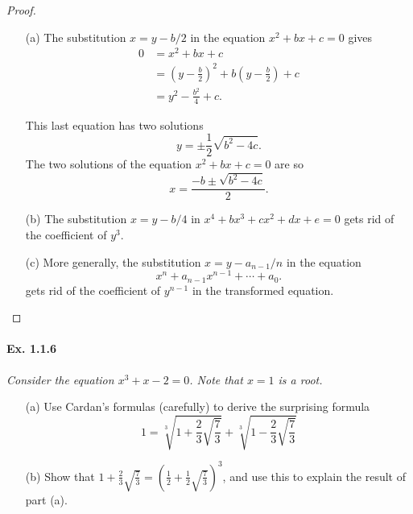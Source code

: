\documentclass[11pt,a4paper]{article}
\begin{document}
\begin{proof}
\begin{enumerate}
\item[(a)] The substitution $x = y - b/2$ in the equation $x^2+bx+c=0$ gives
\begin{align*}
0 &= x^2 + bx +c \\
&=\left ( y - \frac{b}{2}\right )^2 + b \left ( y - \frac{b}{2}\right ) + c\\
&=y^2 - \frac{b^2}{4} + c.
\end{align*}

This last equation has two solutions
$$y = \pm \frac{1}{2} \sqrt{b^2-4c}.$$
The two solutions of the equation $x^2+bx+c=0$ are so
$$x = \frac{-b  \pm \sqrt{b^2-4c}}{2}.$$


\item[(b)] The substitution $x = y-b/4$  in $x^4+bx^3+cx^2+dx+e=0$ gets rid of the coefficient of $y^3$.


\item[(c)] More generally, the substitution $x= y - a_{n-1}/n$ in the equation
$$x^n +  a_{n-1} x^{n-1}+ \cdots + a_0.$$
gets rid of the coefficient of $y^{n-1}$ in the transformed equation.

\end{enumerate}
\end{proof}

\paragraph{Ex. 1.1.6}

{\it Consider the equation $x^3+x-2 = 0$. Note that $x=1$ is a root.
\begin{enumerate}
\item[(a)] Use Cardan's formulas (carefully) to derive the surprising formula
$$1 = \sqrt[3]{1 + \frac{2}{3} \sqrt{\frac{7}{3}}} + \sqrt[3]{1 - \frac{2}{3} \sqrt{\frac{7}{3}}}$$
\item[(b)] Show that $1 + \frac{2}{3} \sqrt{\frac{7}{3}} = \left(\frac{1}{2}+ \frac{1}{2}\sqrt{\frac{7}{3}} \right)^3$, and use this to explain the result of part (a).
\end{enumerate}
}
\end{document}
